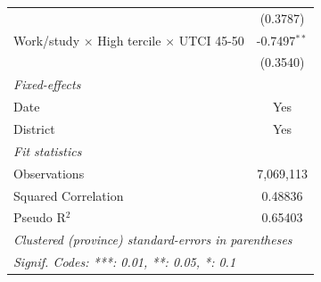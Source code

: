 \begin{table}[htbp]
\begin{tabular}{lc}
                                                                        & (0.3787)\\   
      Work/study $\times$ High tercile $\times$ UTCI 45-50              & -0.7497$^{**}$\\   
                                                                        & (0.3540)\\   
      \midrule
      \emph{Fixed-effects}\\
      Date                                                              & Yes\\  
      District                                                          & Yes\\  
      \midrule
      \emph{Fit statistics}\\
      Observations                                                      & 7,069,113\\  
      Squared Correlation                                               & 0.48836\\  
      Pseudo R$^2$                                                      & 0.65403\\  
      \midrule \midrule
      \multicolumn{2}{l}{\emph{Clustered (province) standard-errors in parentheses}}\\
      \multicolumn{2}{l}{\emph{Signif. Codes: ***: 0.01, **: 0.05, *: 0.1}}\\
   \end{tabular}
\end{table}


